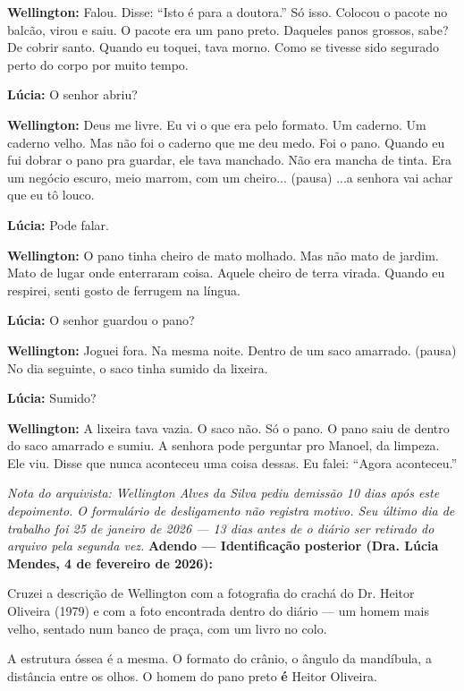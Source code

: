 \noindent \textbf{Wellington:} Falou. Disse: \textquotedblleft{}Isto é para a doutora.\textquotedblright{} Só isso. Colocou o pacote no balcão, virou e saiu. O pacote era um pano preto. Daqueles panos grossos, sabe? De cobrir santo. Quando eu toquei, tava morno. Como se tivesse sido segurado perto do corpo por muito tempo.

\noindent \textbf{Lúcia:} O senhor abriu?

\noindent \textbf{Wellington:} Deus me livre. Eu vi o que era pelo formato. Um caderno. Um caderno velho. Mas não foi o caderno que me deu medo. Foi o pano. Quando eu fui dobrar o pano pra guardar, ele tava manchado. Não era mancha de tinta. Era um negócio escuro, meio marrom, com um cheiro... (pausa) ...a senhora vai achar que eu tô louco.

\noindent \textbf{Lúcia:} Pode falar.

\noindent \textbf{Wellington:} O pano tinha cheiro de mato molhado. Mas não mato de jardim. Mato de lugar onde enterraram coisa. Aquele cheiro de terra virada. Quando eu respirei, senti gosto de ferrugem na língua.

\noindent \textbf{Lúcia:} O senhor guardou o pano?

\noindent \textbf{Wellington:} Joguei fora. Na mesma noite. Dentro de um saco amarrado. (pausa) No dia seguinte, o saco tinha sumido da lixeira.

\noindent \textbf{Lúcia:} Sumido?

\noindent \textbf{Wellington:} A lixeira tava vazia. O saco não. Só o pano. O pano saiu de dentro do saco amarrado e sumiu. A senhora pode perguntar pro Manoel, da limpeza. Ele viu. Disse que nunca aconteceu uma coisa dessas. Eu falei: \textquotedblleft{}Agora aconteceu.\textquotedblright{}

\noindent \textit{Nota do arquivista: Wellington Alves da Silva pediu demissão 10 dias após este depoimento. O formulário de desligamento não registra motivo. Seu último dia de trabalho foi 25 de janeiro de 2026 --- 13 dias antes de o diário ser retirado do arquivo pela segunda vez.}
\noindent \textbf{Adendo --- Identificação posterior (Dra. Lúcia Mendes, 4 de fevereiro de 2026):}

\noindent Cruzei a descrição de Wellington com a fotografia do crachá do Dr. Heitor Oliveira (1979) e com a foto encontrada dentro do diário --- um homem mais velho, sentado num banco de praça, com um livro no colo.

\noindent A estrutura óssea é a mesma. O formato do crânio, o ângulo da mandíbula, a distância entre os olhos. O homem do pano preto \textbf{é} Heitor Oliveira.

